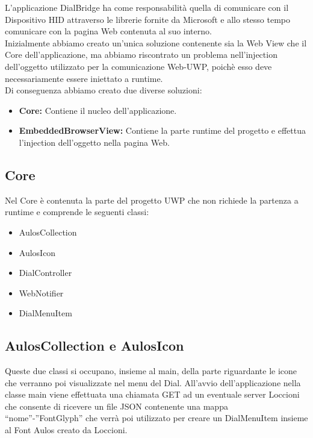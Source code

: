 L’applicazione DialBridge ha come responsabilità quella di comunicare con il Dispositivo HID attraverso le librerie fornite da Microsoft e allo stesso tempo comunicare con la pagina Web contenuta al suo interno.\\

Inizialmente abbiamo creato un’unica soluzione contenente sia la Web View che il Core dell’applicazione, ma abbiamo riscontrato un problema nell’injection dell’oggetto utilizzato per la comunicazione Web-UWP, poichè esso deve necessariamente essere iniettato a runtime.\\

Di conseguenza abbiamo creato due diverse soluzioni:

\begin{itemize}
\item \textbf{Core:} Contiene il nucleo dell’applicazione.
\item \textbf{EmbeddedBrowserView:} Contiene la parte runtime del progetto e effettua l’injection dell’oggetto nella pagina Web.
\end{itemize}

\subsection{Core}

Nel Core è contenuta la parte del progetto UWP che non richiede la partenza a runtime e comprende le seguenti classi:

\begin{itemize}
\item AulosCollection
\item AulosIcon
\item DialController
\item WebNotifier
\item DialMenuItem
\end{itemize}

\subsection{AulosCollection e AulosIcon}

Queste due classi si occupano, insieme al main, della parte riguardante le icone che verranno poi visualizzate nel menu del Dial. All’avvio dell’applicazione nella classe main viene effettuata una chiamata GET ad un eventuale server Loccioni che consente di ricevere un file JSON contenente una mappa “nome”-”FontGlyph” che verrà poi utilizzato per creare un DialMenuItem insieme al Font Aulos creato da Loccioni.\\

